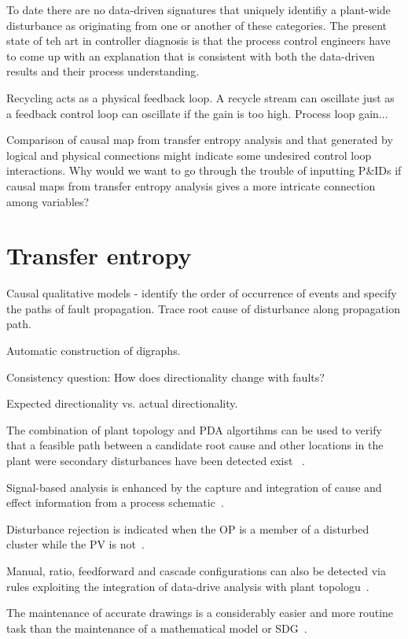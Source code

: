 To date there are no data-driven signatures that uniquely identifiy a plant-wide disturbance as originating from one or another of these categories.
The present state of teh art in controller diagnosis is that the process control engineers have to come up with an explanation that is consistent with both the data-driven results and their process understanding.

Recycling acts as a physical feedback loop.
A recycle stream can oscillate just as a feedback control loop can oscillate if the gain is too high.
Process loop gain...

Comparison of causal map from transfer entropy analysis and that generated by logical and physical connections might indicate some undesired control loop interactions.
Why would we want to go through the trouble of inputting P\&IDs if causal maps from transfer entropy analysis gives a more intricate connection among variables?


\section{Transfer entropy}


Causal qualitative models - identify the order of occurrence of events and specify the paths of fault propagation.
Trace root cause of disturbance along propagation path.

Automatic construction of digraphs.

Consistency question:
How does directionality change with faults?

Expected directionality vs. actual directionality.

The combination of plant topology and PDA algortihms can be used to verify that a feasible path between a candidate root cause and other locations in the plant were secondary disturbances have been detected exist ~\cite{Yim2006}.

Signal-based analysis is enhanced by the capture and integration of cause and effect information from a process schematic~\cite{Yim2006}.

Disturbance rejection is indicated when the OP is a member of a disturbed cluster while the PV is not~\cite{Yim2006}.

Manual, ratio, feedforward and cascade configurations can also be detected via rules exploiting the integration of data-drive analysis with plant topologu~\cite{Yim2006}.

The maintenance of accurate drawings is a considerably easier and more routine task than the maintenance of a mathematical model or SDG~\cite{Yim2006}.

